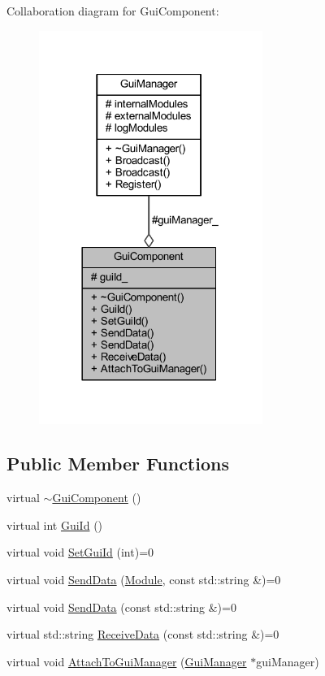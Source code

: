 Collaboration diagram for Gui\+Component\+:
\nopagebreak
\begin{figure}[H]
\begin{center}
\leavevmode
\includegraphics[width=206pt]{class_gui_component__coll__graph}
\end{center}
\end{figure}
\subsection*{Public Member Functions}
\begin{DoxyCompactItemize}
\item 
virtual \mbox{\hyperlink{class_gui_component_a1a24d7d4f14f0bcd7d9f81a397c79f4e}{$\sim$\+Gui\+Component}} ()
\item 
virtual int \mbox{\hyperlink{class_gui_component_a57b8809f4ce6a4e238c5b87c158da99b}{Gui\+Id}} ()
\item 
virtual void \mbox{\hyperlink{class_gui_component_a27d0d28dbc048b7cd3ad63e8a1961021}{Set\+Gui\+Id}} (int)=0
\item 
virtual void \mbox{\hyperlink{class_gui_component_a131dadcfcbe0278cf6c995a64cca871f}{Send\+Data}} (\mbox{\hyperlink{_mediator_2_mediator_2_commons_8h_a88683b64d84542943724ba0f211153af}{Module}}, const std\+::string \&)=0
\item 
virtual void \mbox{\hyperlink{class_gui_component_a50da12b404e7ef1adbebafdabd66884f}{Send\+Data}} (const std\+::string \&)=0
\item 
virtual std\+::string \mbox{\hyperlink{class_gui_component_ad136b2da6c63d7d3147f6cc411696cfe}{Receive\+Data}} (const std\+::string \&)=0
\item 
virtual void \mbox{\hyperlink{class_gui_component_a34ffc6f2ca0ce6f58c9fb6a2fd3e1a32}{Attach\+To\+Gui\+Manager}} (\mbox{\hyperlink{class_gui_manager}{Gui\+Manager}} $\ast$gui\+Manager)
\end{DoxyCompactItemize}
